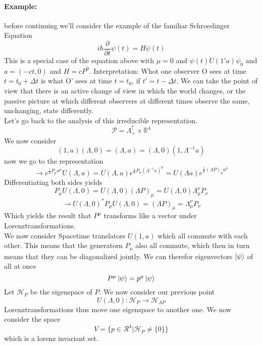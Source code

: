\documentclass{report}
\begin{document}
\paragraph{Example:} before continuing we'll consider the example of the familiar Schroedinger Equation \[
  i\hbar \frac{\partial}{\partial t  } \psi\left( t \right) = H \psi\left( t \right) 
\] This is a special case of the equation above with $\mu = 0$ and $\psi\left( t \right)  U\left( 1' a \right) \psi_0$ and $a=\left( -ct, 0 \right)$ and $H = c P^0$.
Interpretation: Whot one observer O sees at time  $t=t_0+\Delta t$ is what O' sees at time  $t=t_0$, if $t'= t - \Delta t$. We can take the point of view that there is an active change of view in which the world changes, or the passive picture at which different observers at different times observe the same, unchanging, state differently.\\
Let's go back to the analysis of this irreducible representation. \[
  \mathcal{P} = \Lambda_+^\uparrow \times \mathbb{R}^4
\] We now consider \[
\left( 1, a \right) \left( \Lambda, 0 \right) = \left( \Lambda, a \right) = \left( \Lambda, 0 \right) \left( 1, \Lambda^{-1} a \right) 
\] now we go to the representation \[
\to e^{\frac{i}{\hbar} P_\mu a^\mu} U\left( \Lambda, a \right) = U\left( \Lambda, a \right)  e^{\frac{i}{\hbar}P_\mu \left( \Lambda^{-1} a \right) ^\mu} = U\left( \Lambda a \right) e^{\frac{i}{\hbar}\left( \Lambda P \right) _\mu a^\mu}
\] Differentiating both sides yields \[
P_\mu U\left( \Lambda, 0 \right) = U\left( \Lambda, 0 \right) \left( \Lambda P \right) _\mu = U\left( \Lambda, 0 \right) \Lambda_\mu^\nu P_\nu
\] \[
\to U\left( \Lambda, 0 \right)^* P_\mu U\left( \Lambda, 0 \right) = \left( \Lambda P \right) _\mu = \Lambda_\mu^\nu P_\nu
  \] Which yields the result that $P^\mu$ transforms like a vector under Lorenztransformations.\\
  We now consider Spacetime translators $U\left( 1, a \right) $ which all commute with each other. This means that the generatorn $P_\mu$ also all commute, which then in turn means that they can be diagonalized jointly. We can therefor eigenvectors $\ket{\psi}$ of all at once \[
  P^\mu \ket{\psi} = p^\mu \ket{\psi}
  \] 
  Let $\mathcal{H}_P$ be the eigenspace of $P$. We now consider our previous point \[
    U\left( \Lambda, 0 \right) : \mathcal{H}_P \to \mathcal{H}_{\Lambda P}
  \] Lorenztransformations thus move one eigenspace to another one.
  We now consider the space  \[
    V = \{ p \in \mathcal{R}^4 | \mathcal{H}_P \neq \{0\}\}
  \] which is a lorenz invariant set. \\
\end{document}
